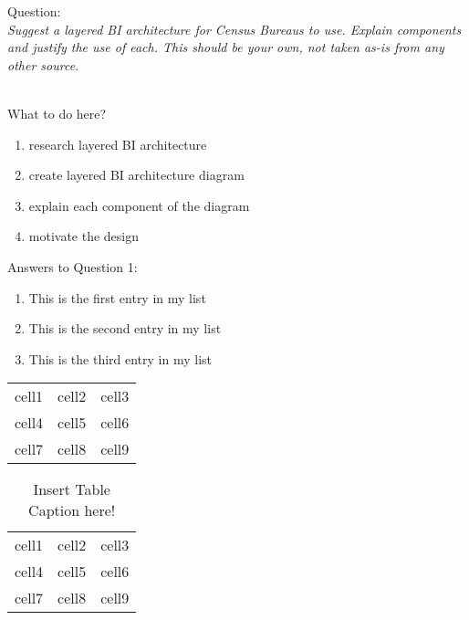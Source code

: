 Question:\\
\emph{Suggest a layered BI architecture for Census Bureaus to use. Explain components and
justify the use of each. This should be your own, not taken as-is from any other source.}

\\

What to do here?
\begin{enumerate}
    \item research layered BI architecture
    \item create layered BI architecture diagram
    \item explain each component of the diagram
    \item motivate the design
  \end{enumerate}

\newpage Answers to Question 1:

\newpage 
\begin{enumerate}
  \item This is the first entry in my list
  \item This is the second entry in my list
  \item This is the third entry in my list
\end{enumerate}

\begin{center}
    \begin{tabular}{ c c c }
        cell1 & cell2 & cell3 \\ 
        cell4 & cell5 & cell6 \\  
        cell7 & cell8 & cell9    
    \end{tabular}
\end{center}

\begin{table}[h]
\centering
    \begin{tabular}{ |c| c| c| }
     \hline
        cell1 & cell2 & cell3 \\ 
        cell4 & cell5 & cell6 \\  
        cell7 & cell8 & cell9 \\  
     \hline
    \end{tabular}\\
    \caption{Insert Table Caption here!}
    \label{table:1}
\end{table}